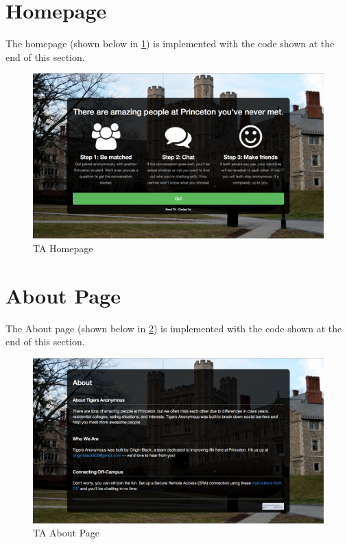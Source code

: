 \section{Homepage}

The homepage (shown below in \ref{fig:TAHomepage}) is implemented with the code shown at the end of this section.

\begin{figure}[h]
\centering
\includegraphics[trim= 35mm 0mm 35mm 0mm, clip, scale=0.25]{./Figures/TAHomepage}
\caption{TA Homepage}
\label{fig:TAHomepage}
\end{figure}

\lstset{language=HTML}


\section{About Page}

The About page (shown below in \ref{fig:TAAbout}) is implemented with the code shown at the end of this section.

\begin{figure}[h]
\centering
\includegraphics[trim= 35mm 0mm 35mm 0mm, clip, scale=0.25]{./Figures/TAAbout}
\caption{TA About Page}
\label{fig:TAAbout}
\end{figure}

